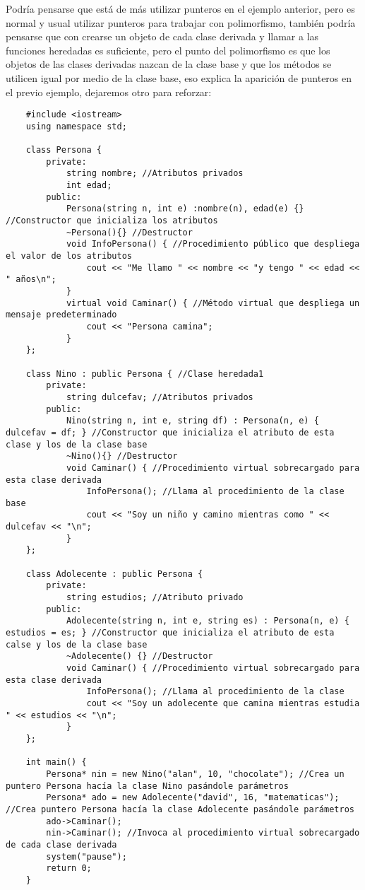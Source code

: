 Podría pensarse que está de más utilizar punteros en el ejemplo anterior, pero es normal y usual utilizar punteros para trabajar con polimorfismo, también podría pensarse que con crearse un objeto de cada clase derivada y llamar a las funciones heredadas es suficiente, pero el punto del polimorfismo es que los objetos de las clases derivadas nazcan de la clase base y que los métodos se utilicen igual por medio de la clase base, eso explica la aparición de punteros en el previo ejemplo, dejaremos otro para reforzar:
\begin{lstlisting}
    #include <iostream>
    using namespace std;
    
    class Persona {
        private:
            string nombre; //Atributos privados
            int edad;
        public:
            Persona(string n, int e) :nombre(n), edad(e) {} //Constructor que inicializa los atributos
            ~Persona(){} //Destructor
            void InfoPersona() { //Procedimiento público que despliega el valor de los atributos
                cout << "Me llamo " << nombre << "y tengo " << edad << " años\n";
            }
            virtual void Caminar() { //Método virtual que despliega un mensaje predeterminado
                cout << "Persona camina";
            }
    };

    class Nino : public Persona { //Clase heredada1
        private:
            string dulcefav; //Atributos privados
        public:
            Nino(string n, int e, string df) : Persona(n, e) { dulcefav = df; } //Constructor que inicializa el atributo de esta clase y los de la clase base
            ~Nino(){} //Destructor
            void Caminar() { //Procedimiento virtual sobrecargado para esta clase derivada
                InfoPersona(); //Llama al procedimiento de la clase base
                cout << "Soy un niño y camino mientras como " << dulcefav << "\n";
            }
    };

    class Adolecente : public Persona {
        private:
            string estudios; //Atributo privado
        public:
            Adolecente(string n, int e, string es) : Persona(n, e) { estudios = es; } //Constructor que inicializa el atributo de esta calse y los de la clase base
            ~Adolecente() {} //Destructor
            void Caminar() { //Procedimiento virtual sobrecargado para esta clase derivada
                InfoPersona(); //Llama al procedimiento de la clase
                cout << "Soy un adolecente que camina mientras estudia " << estudios << "\n";
            }
    };

    int main() {
        Persona* nin = new Nino("alan", 10, "chocolate"); //Crea un puntero Persona hacía la clase Nino pasándole parámetros
        Persona* ado = new Adolecente("david", 16, "matematicas"); //Crea puntero Persona hacía la clase Adolecente pasándole parámetros
        ado->Caminar();
        nin->Caminar(); //Invoca al procedimiento virtual sobrecargado de cada clase derivada
        system("pause");
        return 0;
    }
\end{lstlisting}


